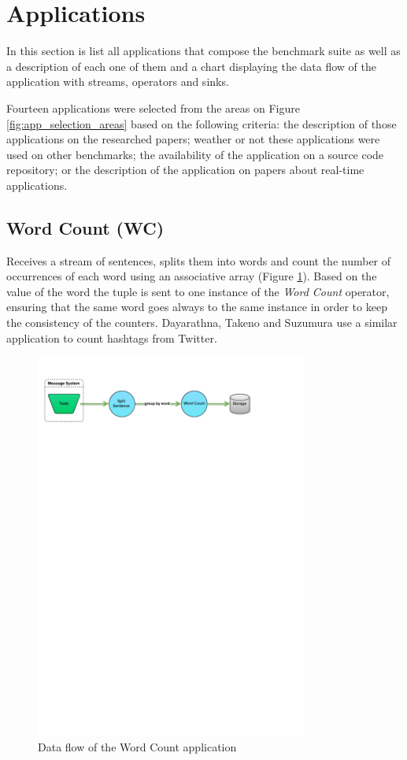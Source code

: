 \documentclass[ppgc,diss,english]{iiufrgs}
\begin{document}
\section{Applications}
\label{sec:applications}

In this section is list all applications that compose the benchmark suite as well as a description of each one of them and a chart displaying the data flow of the application with streams, operators and sinks.

Fourteen applications were selected from the areas on Figure \ref{fig:app_selection_areas} based on the following criteria: the description of those applications on the researched papers; weather or not these applications were used on other benchmarks; the availability of the application on a source code repository; or the description of the application on papers about real-time applications.

\subsection{Word Count (WC)}

Receives a stream of sentences, splits them into words and count the number of occurrences of each word using an associative array (Figure \ref{fig:app_wordcount}). Based on the value of the word the tuple is sent to one instance of the \emph{Word Count} operator, ensuring that the same word goes always to the same instance in order to keep the consistency of the counters. Dayarathna, Takeno and Suzumura \cite{dayarathna2011performance} use a similar application to count hashtags from Twitter.

\begin{figure}[!ht]
	\centering
	\includegraphics[width=0.8\textwidth]{images/apps/WordCount.pdf}
	\caption{Data flow of the Word Count application}
	\label{fig:app_wordcount}
\end{figure}
\end{document}
